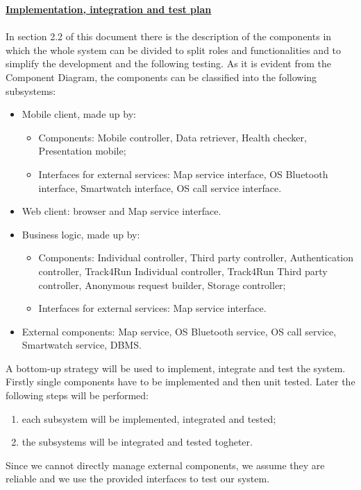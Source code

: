 	\underline{\textbf{Implementation, integration and test plan}}\\\\
In section 2.2 of this document there is the description of the components in which the whole system can be divided to split roles and functionalities and to simplify the development and the following testing.
As it is evident from the Component Diagram, the components can be classified into the following subsystems:
	\begin{itemize}
	\item Mobile client, made up by:
		\begin{itemize}
		\item Components: Mobile controller,  Data retriever, Health checker, Presentation mobile;
		\item Interfaces for external services: Map service interface, OS Bluetooth interface, Smartwatch interface, OS call service interface.
		\end{itemize}
	\item Web client: browser and Map service interface.
	\item Business logic, made up by:
		\begin{itemize}
		\item Components: Individual controller, Third party controller, Authentication controller, Track4Run Individual controller, Track4Run Third party controller, Anonymous request builder, Storage controller;
		\item Interfaces for external services: Map service interface.
		\end{itemize}
	\item External components: Map service, OS Bluetooth service, OS call service, Smartwatch service, DBMS.\\
	\end{itemize}

A bottom-up strategy will be used to implement, integrate and test the system.
Firstly single components have to be implemented and then unit tested. Later the following steps will be performed:
	\begin{enumerate} 
	\item each subsystem will be implemented, integrated and tested;
	\item the subsystems will be integrated and tested togheter.\\
	\end{enumerate}
Since we cannot directly manage external components, we assume they are reliable and we use the provided interfaces to test our system.\\

